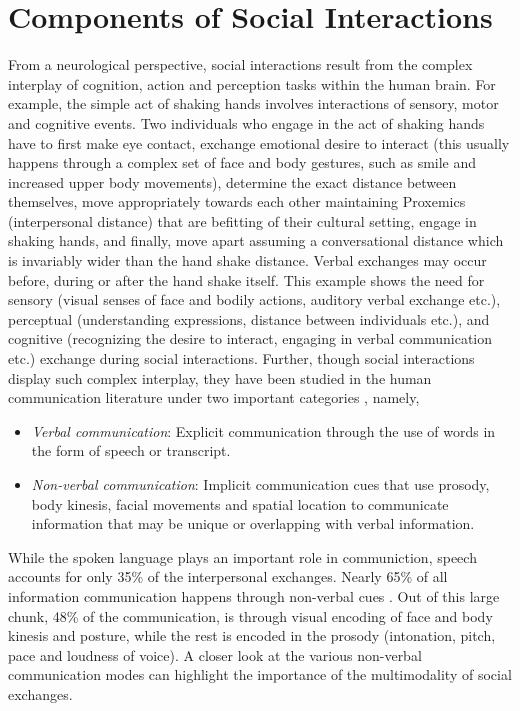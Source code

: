 \documentclass[oneside,11pt]{memoir}
\begin{document}
\section{Components of Social Interactions}
From a neurological perspective, social interactions result from the complex interplay of cognition, action and perception tasks within the human brain. For example, the simple act of shaking hands involves interactions of sensory, motor and cognitive events. Two individuals who engage in the act of shaking hands have to first make eye contact, exchange emotional desire to interact (this usually happens through a complex set of face and body gestures, such as smile and increased upper body movements), determine the exact distance between themselves, move appropriately towards each other maintaining Proxemics (interpersonal distance) that are befitting of their cultural setting, engage in shaking hands, and finally, move apart assuming a conversational distance which is invariably wider than the hand shake distance. Verbal exchanges may occur before, during or after the hand shake itself. This example shows the need for sensory (visual senses of face and bodily actions, auditory verbal exchange etc.), perceptual (understanding expressions, distance between individuals etc.), and cognitive (recognizing the desire to interact, engaging in verbal communication etc.) exchange during social interactions. Further, though social interactions display such complex interplay, they have been studied in the human communication literature under two important categories \cite{brent_d._ruben_human_1975}, namely, 

\begin{itemize}
\item \emph {Verbal communication}: Explicit communication through the use of words in the form of speech or transcript.
\item \emph {Non-verbal communication}: Implicit communication cues that use prosody, body kinesis, facial movements and spatial location to communicate information that may be unique or overlapping with verbal information. 
\end{itemize}

While the spoken language plays an important role in communiction, speech accounts for only 35\% of the interpersonal exchanges. Nearly 65\% of all information communication happens through non-verbal cues \cite{borkenau_thin_2004}. Out of this large chunk, 48\% of the communication, is through visual encoding of face and body kinesis and posture, while the rest is encoded in the prosody (intonation, pitch, pace and loudness of voice). A closer look at the various non-verbal communication modes can highlight the importance of the multimodality of social exchanges.
\end{document}
